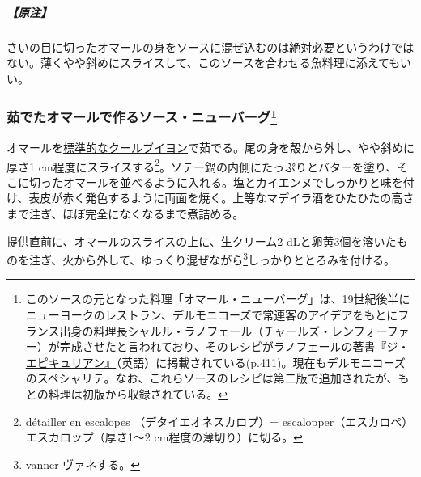 \begin{recette}
\hypertarget{nota-sauce-new-burg-avec-le-homard-cru}{%
\subparagraph{【原注】}\label{nota-sauce-new-burg-avec-le-homard-cru}}

さいの目に切ったオマールの身をソースに混ぜ込むのは絶対必要というわけではない。薄くやや斜めにスライスして、このソースを合わせる魚料理に添えてもいい。

\atoaki{}

\hypertarget{sauce-new-burg-avec-le-homard-cuit}{%
\subsubsection[茹でたオマールで作るソース・ニューバーグ]{\texorpdfstring{茹でたオマールで作るソース・ニューバーグ\footnote{このソースの元となった料理「オマール・ニューバーグ」は、19世紀後半にニューヨークのレストラン、デルモニコーズで常連客のアイデアをもとにフランス出身の料理長シャルル・ラノフェール（チャールズ・レンフォーファー）が完成させたと言われており、そのレシピがラノフェールの著書\href{https://archive.org/details/epicureancomplet00ranhrich}{『ジ・エピキュリアン』}（英語）に掲載されている(p.411)。現在もデルモニコーズのスペシャリテ。なお、これらソースのレシピは第二版で追加されたが、もとの料理は初版から収録されている。}}{茹でたオマールで作るソース・ニューバーグ}}\label{sauce-new-burg-avec-le-homard-cuit}}



オマールを\protect\hyperlink{court-bouillon-e}{標準的なクールブイヨン}で茹でる。尾の身を殻から外し、やや斜めに厚さ1
cm程度にスライスする\footnote{détailler en escalopes
  （デタイエオネスカロプ）= escalopper（エスカロペ）
  エスカロップ（厚さ1〜2 cm程度の薄切り）に切る。}。ソテー鍋の内側にたっぷりとバターを塗り、そこに切ったオマールを並べるように入れる。塩とカイエンヌでしっかりと味を付け、表皮が赤く発色するように両面を焼く。上等なマデイラ酒をひたひたの高さまで注ぎ、ほぼ完全になくなるまで煮詰める。

提供直前に、オマールのスライスの上に、生クリーム2
dLと卵黄3個を溶いたものを注ぎ、火から外して、ゆっくり混ぜながら\footnote{vanner
  ヴァネする。}しっかりととろみを付ける。


\end{recette}
